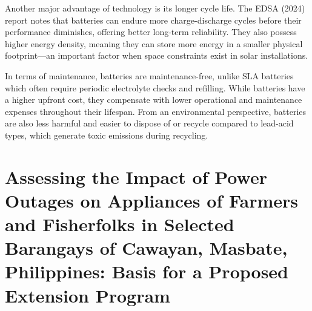 {Another major advantage of  technology is its longer cycle life. The EDSA (2024) report notes that  batteries can endure more charge-discharge cycles before their performance diminishes, offering better long-term reliability. They also possess higher energy density, meaning they can store more energy in a smaller physical footprint—an important factor when space constraints exist in solar installations.

In terms of maintenance,  batteries are maintenance-free, unlike SLA batteries which often require periodic electrolyte checks and refilling. While  batteries have a higher upfront cost, they compensate with lower operational and maintenance expenses throughout their lifespan. From an environmental perspective,  batteries are also less harmful and easier to dispose of or recycle compared to lead-acid types, which generate toxic emissions during recycling.

\section{Assessing the Impact of Power Outages on Appliances of Farmers and Fisherfolks in Selected Barangays of Cawayan, Masbate, Philippines: Basis for a Proposed Extension Program}

}
